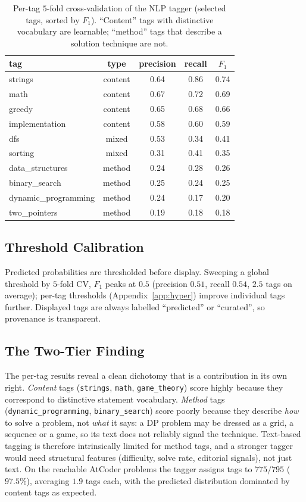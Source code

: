 \documentclass[12pt,a4paper]{article}
\begin{document}
\begin{table}[h]
\centering
\caption{Per-tag $5$-fold cross-validation of the NLP tagger (selected tags, sorted by
$F_1$). ``Content'' tags with distinctive vocabulary are learnable; ``method'' tags that
describe a solution technique are not.}
\label{tab:tagger}
\small
\begin{tabular}{lcccc}
\toprule
tag & type & precision & recall & $F_1$ \\
\midrule
strings              & content & 0.64 & 0.86 & 0.74 \\
math                 & content & 0.67 & 0.72 & 0.69 \\
greedy               & content & 0.65 & 0.68 & 0.66 \\
implementation       & content & 0.58 & 0.60 & 0.59 \\
dfs                  & mixed   & 0.53 & 0.34 & 0.41 \\
sorting              & mixed   & 0.31 & 0.41 & 0.35 \\
data\_structures     & method  & 0.24 & 0.28 & 0.26 \\
binary\_search       & method  & 0.25 & 0.24 & 0.25 \\
dynamic\_programming & method  & 0.24 & 0.17 & 0.20 \\
two\_pointers        & method  & 0.19 & 0.18 & 0.18 \\
\bottomrule
\end{tabular}
\end{table}

\subsection{Threshold Calibration}
Predicted probabilities are thresholded before display. Sweeping a global threshold by
$5$-fold CV, $F_1$ peaks at $0.5$ (precision $0.51$, recall $0.54$, $2.5$ tags on
average); per-tag thresholds (Appendix~\ref{app:hyper}) improve individual tags further.
Displayed tags are always labelled ``predicted'' or ``curated'', so provenance is
transparent.

\subsection{The Two-Tier Finding}
The per-tag results reveal a clean dichotomy that is a contribution in its own right.
\emph{Content} tags (\texttt{strings}, \texttt{math}, \texttt{game\_theory}) score highly
because they correspond to distinctive statement vocabulary. \emph{Method} tags
(\texttt{dynamic\_programming}, \texttt{binary\_search}) score poorly because they describe
\emph{how} to solve a problem, not \emph{what} it says: a DP problem may be dressed as a
grid, a sequence or a game, so its text does not reliably signal the technique. Text-based tagging is therefore intrinsically limited for
method tags, and a stronger tagger would need structural features (difficulty, solve
rate, editorial signals), not just text. On the reachable AtCoder problems the tagger
assigns tags to $775/795$ ($97.5\%$), averaging $1.9$ tags each, with the predicted
distribution dominated by content tags as expected.
\end{document}

